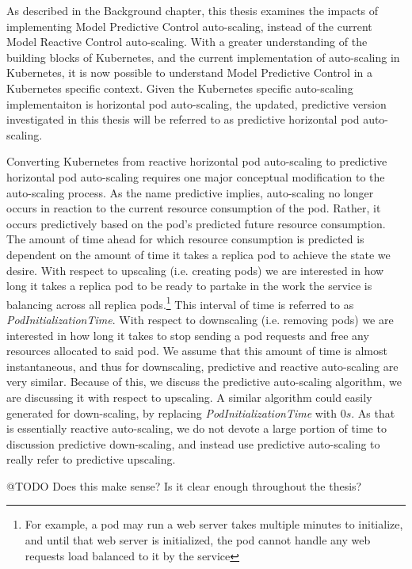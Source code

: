 As described in the Background chapter, this thesis examines the impacts of
implementing Model Predictive Control auto-scaling, instead of the current Model Reactive
Control auto-scaling. With a greater understanding of the building blocks of
Kubernetes, and the current implementation of auto-scaling in Kubernetes, it is
now possible to understand Model Predictive Control in a Kubernetes specific
context. Given the Kubernetes specific auto-scaling implementaiton is horizontal
pod auto-scaling, the updated, predictive version investigated in this thesis
will be referred to as predictive horizontal pod auto-scaling.

Converting Kubernetes from reactive horizontal pod auto-scaling to predictive
horizontal pod auto-scaling requires one major conceptual modification to the
auto-scaling process. As the name predictive implies, auto-scaling no longer
occurs in reaction to the current resource consumption of the pod. Rather, it occurs
predictively based on the pod's predicted future resource consumption. The
amount of time ahead for which resource consumption is predicted is dependent on
the amount of time it takes a replica pod to achieve the state we desire. With
respect to upscaling (i.e. creating pods) we are interested in how long it
takes a replica pod to be ready to partake in the work the
service is balancing across all replica pods.\footnote{For example, a pod may
run a web server takes multiple minutes to initialize, and until that web server
is initialized, the pod cannot handle any web requests load balanced to it by
the service} This interval of time is referred to as \textit{PodInitializationTime}.
With respect to downscaling (i.e. removing pods) we are interested in how long
it takes to stop sending a pod requests and free any resources allocated to said
pod. We assume that this amount of time is almost instantaneous, and thus for
downscaling, predictive and reactive auto-scaling are very similar. Because of
this, we discuss the predictive auto-scaling algorithm, we are discussing it
with respect to upscaling. A similar algorithm could easily generated for
down-scaling, by replacing \textit{PodInitializationTime} with $0s$. As that is
essentially reactive auto-scaling, we do not devote a large portion of time to
discussion predictive down-scaling, and instead use predictive auto-scaling to
really refer to predictive upscaling.

@TODO Does this make sense? Is it clear enough throughout the thesis?

